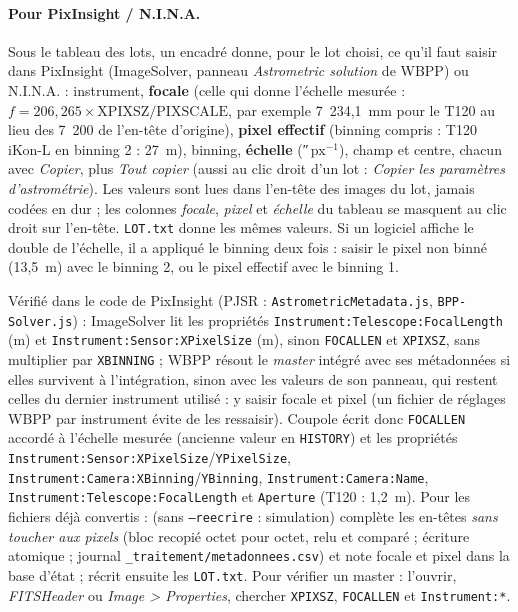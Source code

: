 \paragraph{Pour PixInsight / N.I.N.A.} Sous le tableau des lots, un encadré donne, pour le lot choisi, ce qu'il
faut saisir dans PixInsight (ImageSolver, panneau \emph{Astrometric solution} de WBPP) ou N.I.N.A. : instrument,
\textbf{focale} (celle qui donne l'échelle mesurée : $f = 206{,}265 \times \mathrm{XPIXSZ} / \mathrm{PIXSCALE}$,
par exemple 7~234,1~mm pour le T120 au lieu des 7~200 de l'en-tête d'origine), \textbf{pixel effectif} (binning
compris : T120 iKon-L en binning 2 : 27~\textmu m), binning, \textbf{échelle} (\si{\arcsecond}\,px$^{-1}$), champ et
centre, chacun avec \emph{Copier}, plus \emph{Tout copier} (aussi au clic droit d'un lot : \emph{Copier les
paramètres d'astrométrie}). Les valeurs sont lues dans l'en-tête des images du lot, jamais codées en dur ; les
colonnes \emph{focale}, \emph{pixel} et \emph{échelle} du tableau se masquent au clic droit sur l'en-tête.
\texttt{LOT.txt} donne les mêmes valeurs. Si un logiciel affiche le double de l'échelle, il a appliqué le binning
deux fois : saisir le pixel non binné (13,5~\textmu m) avec le binning 2, ou le pixel effectif avec le binning 1.

Vérifié dans le code de PixInsight (PJSR : \texttt{AstrometricMetadata.js}, \texttt{BPP-Solver.js}) : ImageSolver
lit les propriétés \texttt{Instrument:Telescope:FocalLength} (m) et \texttt{Instrument:Sensor:XPixelSize}
(\textmu m), sinon \texttt{FOCALLEN} et \texttt{XPIXSZ}, sans multiplier par \texttt{XBINNING} ; WBPP résout le
\emph{master} intégré avec ses métadonnées si elles survivent à l'intégration, sinon avec les valeurs de son panneau,
qui restent celles du dernier instrument utilisé : y saisir focale et pixel (un fichier de réglages WBPP par
instrument évite de les ressaisir). Coupole écrit donc \texttt{FOCALLEN} accordé à l'échelle mesurée (ancienne valeur
en \texttt{HISTORY}) et les propriétés \texttt{Instrument:Sensor:XPixelSize}/\texttt{YPixelSize},
\texttt{Instrument:Camera:XBinning}/\texttt{YBinning}, \texttt{Instrument:Camera:Name},
\texttt{Instrument:Telescope:FocalLength} et \texttt{Aperture} (T120 : 1,2~m). Pour les fichiers déjà convertis :
 (sans \texttt{--reecrire} : simulation) complète les en-têtes
\emph{sans toucher aux pixels} (bloc recopié octet pour octet, relu et comparé ; écriture atomique ; journal
\texttt{\_traitement/metadonnees.csv}) et note focale et pixel dans la base d'état ;  récrit
ensuite les \texttt{LOT.txt}. Pour vérifier un master : l'ouvrir, \emph{FITSHeader} ou \emph{Image > Properties},
chercher \texttt{XPIXSZ}, \texttt{FOCALLEN} et \texttt{Instrument:*}.

